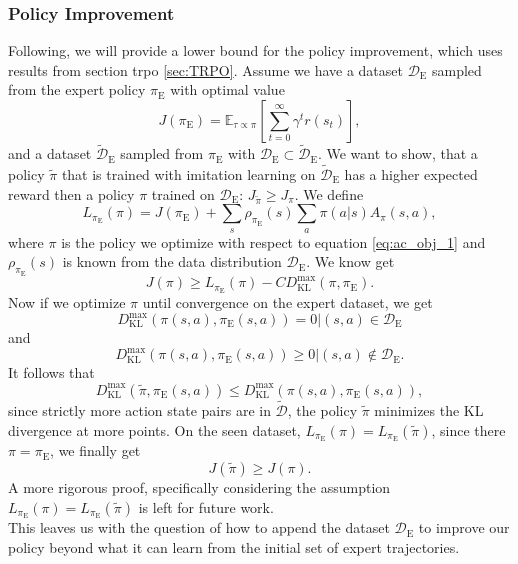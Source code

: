 \subsubsection{Policy Improvement}
Following, we will provide a lower bound for the policy improvement, which uses results from section \ac{trpo} \ref{sec:TRPO}. 
Assume we have a dataset $\mathcal{D}_{\text{E}}$ sampled from the expert policy $\pi_{\text{E}}$ with optimal value 
$$J(\pi_{\text{E}}) =\mathbb{E}_{\tau \propto \pi}\left[\sum_{t=0}^{\infty}  \gamma^t r(s_t) \right],$$
and a dataset $\tilde{\mathcal{D}}_{\text{E}}$ sampled from $\pi_{\text{E}}$ with $\mathcal{D}_{\text{E}} \subset \tilde{\mathcal{D}}_{\text{E}}$. 
We want to show, that a policy $\tilde{\pi}$ that is trained with imitation learning on $\tilde{\mathcal{D}}_{\text{E}}$ has 
a higher expected reward then a policy $\pi$ trained on $\mathcal{D}_{\text{E}}$: $J_{\tilde{\pi}} \geq J_{\pi}$.
We define 
$$L_{\pi_{\text{E}}}(\pi) = J(\pi_{\text{E}}) + \sum_s \rho_{\pi_{\text{E}}}(s) \sum_a \pi(a|s) A_{\pi}(s,a),$$
where $\pi$ is the policy we optimize with respect to equation \ref{eq:ac_obj_1} and $\rho_{\pi_{\text{E}}}(s)$ is known from 
the data distribution $\mathcal{D}_{\text{E}}$. We know get 
$$J({\pi}) \geq L_{\pi_{\text{E}}}({\pi}) - C D^{\max}_{\operatorname{KL}} (\pi,\pi_{\text{E}}).$$
Now if we optimize $\pi$ until convergence on the expert dataset, we get 
$$D^{\max}_{\operatorname{KL}}(\pi(s,a),\pi_{\text{E}}(s,a)) = 0 |(s,a) \in \mathcal{D}_{\text{E}}$$
and 
$$D^{\max}_{\operatorname{KL}}(\pi(s,a),\pi_{\text{E}}(s,a)) \geq 0 |(s,a) \notin \mathcal{D}_{\text{E}}.$$
It follows that 
$$D^{\max}_{\operatorname{KL}}(\tilde{\pi},\pi_{\text{E}}(s,a)) \leq D^{\max}_{\operatorname{KL}}(\pi(s,a),\pi_{\text{E}}(s,a)),$$
since strictly more action state pairs are in $\tilde{\mathcal{D}}$, the policy $\tilde{\pi}$ minimizes the KL divergence at more points.
On the seen dataset, $L_{\pi_{\text{E}}}({\pi}) = L_{\pi_{\text{E}}}({\tilde{\pi}})$, since there $\pi = \pi_{\text{E}}$, we finally get 
\begin{equation}
    J(\tilde{\pi}) \geq J({\pi}).
\end{equation}
A more rigorous proof, specifically considering the assumption $L_{\pi_{\text{E}}}({\pi}) = L_{\pi_{\text{E}}}({\tilde{\pi}})$ is left for future work.\\

This leaves us with the question of how to append the dataset $\mathcal{D}_{\text{E}}$ to improve our policy beyond what it can learn from the 
initial set of expert trajectories.\\

